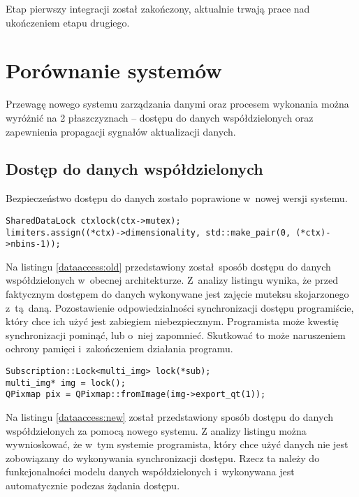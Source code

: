 Etap pierwszy integracji został zakończony, aktualnie trwają prace nad ukończeniem etapu drugiego.

\section{Porównanie systemów}
Przewagę nowego systemu zarządzania danymi oraz procesem wykonania można wyróżnić na 2 płaszczyznach -- dostępu do danych współdzielonych oraz zapewnienia propagacji sygnałów aktualizacji danych.

\subsection{Dostęp do danych współdzielonych}

Bezpieczeństwo dostępu do danych zostało poprawione w~nowej wersji systemu.


\begin{minipage}{\textwidth}
	\begin{lstlisting}[label=dataaccess:old, caption={Przykład dostępu do danych według bieżącego systemu},alsoletter={()[].=}]
SharedDataLock ctxlock(ctx->mutex);
limiters.assign((*ctx)->dimensionality, std::make_pair(0, (*ctx)->nbins-1));
	\end{lstlisting}
\end{minipage}

Na listingu \ref{dataaccess:old} przedstawiony został sposób dostępu do danych współdzielonych w~obecnej architekturze. Z~analizy listingu wynika, że przed faktycznym dostępem do danych wykonywane jest zajęcie muteksu skojarzonego z~tą daną. Pozostawienie odpowiedzialności synchronizacji dostępu programiście, który chce ich użyć jest zabiegiem niebezpiecznym. Programista może kwestię synchronizacji pominąć, lub o~niej zapomnieć. Skutkować to może naruszeniem ochrony pamięci i~zakończeniem działania programu.

\begin{minipage}{\textwidth}
	\begin{lstlisting}[label=dataaccess:new, caption={Przykład dostępu do danych według nowego systemu},alsoletter={()[].=}]
Subscription::Lock<multi_img> lock(*sub);
multi_img* img = lock();
QPixmap pix = QPixmap::fromImage(img->export_qt(1));
	\end{lstlisting}
\end{minipage}

Na listingu \ref{dataaccess:new} został przedstawiony sposób dostępu do danych współdzielonych za pomocą nowego systemu. Z analizy listingu można wywnioskować, że w~tym systemie programista, który chce użyć danych nie jest zobowiązany do wykonywania synchronizacji dostępu. Rzecz ta należy do funkcjonalności modelu danych współdzielonych i~wykonywana jest automatycznie podczas żądania dostępu.

